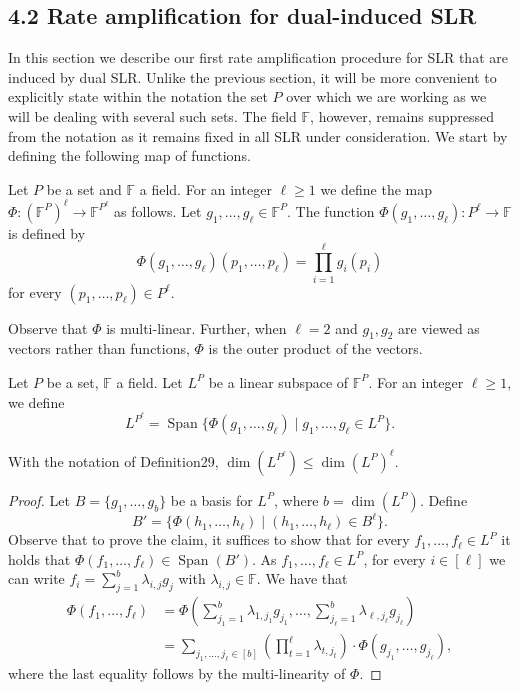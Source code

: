 \subsection*{4.2 Rate amplification for dual-induced SLR}
In this section we describe our first rate amplification procedure for SLR that are induced by dual SLR. Unlike the previous section, it will be more convenient to explicitly state within the notation the set $P$ over which we are working as we will be dealing with several such sets. The field $\mathbb F$, however, remains suppressed from the notation as it remains fixed in all SLR under consideration. We start by defining the following map of functions.
\setcounter{nttheorem}{27}
\begin{ntdefinition}
Let $P$ be a set and $\mathbb F$ a field. For an integer $\ell\geq1$ we define the map $\Phi:(\mathbb F^P)^\ell\to\mathbb F^{P^\ell}$ as follows. Let $g_1,\ldots,g_\ell\in\mathbb F^P$. The function $\Phi(g_1,\ldots,g_\ell):P^\ell\to\mathbb F$ is defined by
\[\Phi(g_1,\ldots,g_\ell)(p_1,\ldots,p_\ell)=\prod_{i=1}^\ell g_i(p_i)\]
for every $(p_1,\ldots,p_\ell)\in P^\ell$.
\end{ntdefinition}
Observe that $\Phi$ is multi-linear. Further, when $\ell=2$ and $g_1,g_2$ are viewed as vectors rather than functions, $\Phi$ is the outer product of the vectors.
\begin{ntdefinition}
Let $P$ be a set, $\mathbb F$ a field. Let $L^P$ be a linear subspace of $\mathbb F^P$. For an integer $\ell\geq1$, we define
\[L^{P^\ell}=\operatorname{Span}\{\Phi(g_1,\ldots,g_\ell)\mid g_1,\ldots,g_\ell\in L^P\}.\]
\end{ntdefinition}
\begin{ntclaim}
With the notation of Definition29, $\dim(L^{P^\ell})\leq\dim(L^P)^\ell$.
\end{ntclaim}
\begin{proof}
Let $B=\{g_1,\ldots,g_b\}$ be a basis for $L^P$, where $b=\dim(L^P)$. Define
\[B'=\{\Phi(h_1,\ldots,h_\ell)\mid(h_1,\ldots,h_\ell)\in B^\ell\}.\]
Observe that to prove the claim, it suffices to show that for every $f_1,\ldots,f_\ell\in L^P$ it holds that $\Phi(f_1,\ldots,f_\ell)\in\operatorname{Span}(B')$. As $f_1,\ldots,f_\ell\in L^P$, for every $i\in[\ell]$ we can write $f_i=\sum_{j=1}^b\lambda_{i,j}g_j$ with $\lambda_{i,j}\in\mathbb F$. We have that
\begin{align*}
\Phi(f_1,\ldots,f_\ell)&=\Phi\left(\sum_{j_1=1}^b\lambda_{1,j_1}g_{j_1},\ldots,\sum_{j_\ell=1}^b\lambda_{\ell,j_\ell}g_{j_\ell}\right)\\
&=\sum_{j_1,\ldots,j_\ell\in[b]}\left(\prod_{t=1}^\ell\lambda_{t,j_t}\right)\cdot\Phi(g_{j_1},\ldots,g_{j_\ell}),
\end{align*}
where the last equality follows by the multi-linearity of $\Phi$.
\end{proof}
